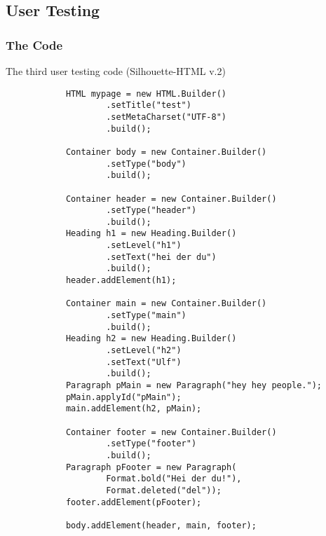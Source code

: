 \documentclass[12pt]{article}
\begin{document}
    \subsection{User Testing}

        \subsubsection{The Code}
        \begin{shaded}
            The third user testing code (Silhouette-HTML v.2)
            \begin{lstlisting}
            HTML mypage = new HTML.Builder()
                    .setTitle("test")
                    .setMetaCharset("UTF-8")
                    .build();

            Container body = new Container.Builder()
                    .setType("body")
                    .build();

            Container header = new Container.Builder()
                    .setType("header")
                    .build();
            Heading h1 = new Heading.Builder()
                    .setLevel("h1")
                    .setText("hei der du")
                    .build();
            header.addElement(h1);

            Container main = new Container.Builder()
                    .setType("main")
                    .build();
            Heading h2 = new Heading.Builder()
                    .setLevel("h2")
                    .setText("Ulf")
                    .build();
            Paragraph pMain = new Paragraph("hey hey people.");
            pMain.applyId("pMain");
            main.addElement(h2, pMain);

            Container footer = new Container.Builder()
                    .setType("footer")
                    .build();
            Paragraph pFooter = new Paragraph(
                    Format.bold("Hei der du!"),
                    Format.deleted("del"));
            footer.addElement(pFooter);

            body.addElement(header, main, footer);
            \end{lstlisting}
        \end{shaded}
\end{document}
